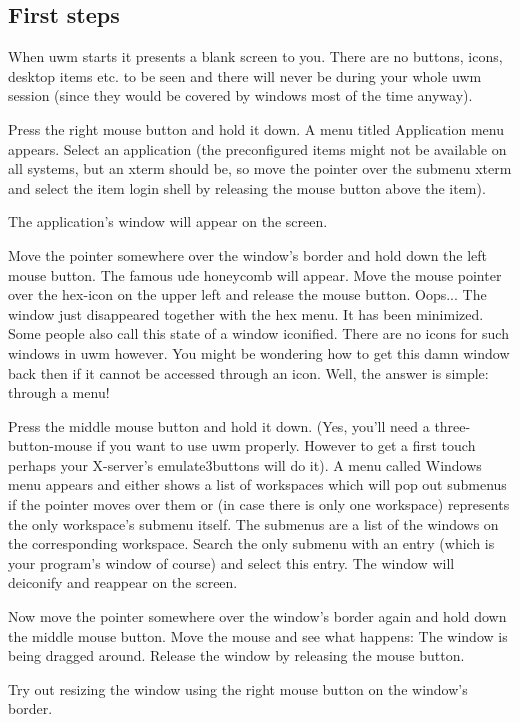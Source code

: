 \documentclass[10pt,a4paper]{article}
\newcommand{\uwm}{{\sc uwm} }
\begin{document}
\subsection{First steps}
When \uwm starts it presents a blank screen to you. There are no buttons, icons, desktop items etc. to be seen and there will never be during your whole \uwm session (since they would be covered by windows most of the time anyway).

Press the right mouse button and hold it down. A menu titled \textsf{Application menu} appears. Select an application (the preconfigured items might not be available on all systems, but an xterm should be, so move the pointer over the submenu \textsf{xterm} and select the item \textsf{login shell} by releasing the mouse button above the item).

The application's window will appear on the screen. 

Move the pointer somewhere over the window's border and hold down the left mouse button. The famous ude honeycomb will appear. Move the mouse pointer over the hex-icon on the upper left and release the mouse button. Oops... The window just disappeared together with the hex menu. It has been minimized. Some people also call this state of a window iconified. There are no icons for such windows in \uwm however. You might be wondering how to get this damn window back then if it cannot be accessed through an icon. Well, the answer is simple: through a menu!

Press the middle mouse button and hold it down. (Yes, you'll need a three-button-mouse if you want to use \uwm properly. However to get a first touch perhaps your X-server's \textsf{emulate3buttons} will do it). A menu called \textsf{Windows menu} appears and either shows a list of workspaces which will pop out submenus if the pointer moves over them or (in case there is only one workspace) represents the only workspace's submenu itself. The submenus are a list of the windows on the corresponding workspace. Search the only submenu with an entry (which is your program's window of course) and select this entry. The window will deiconify and reappear on the screen.

Now move the pointer somewhere over the window's border again and hold down the middle mouse button. Move the mouse and see what happens: The window is being dragged around. Release the window by releasing the mouse button.

Try out resizing the window using the right mouse button on the window's border.
\end{document}
